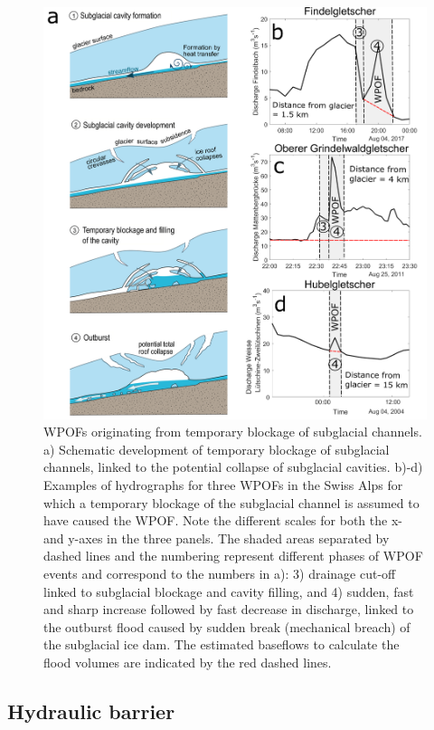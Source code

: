 \begin{figure}
    \centering
    \includegraphics[width=1\textwidth]{chapters/chapter_WPOFs/Temp_blockage.pdf}
    \caption{ WPOFs originating from temporary blockage of subglacial channels. a) Schematic development of temporary blockage of subglacial channels, linked to the potential collapse of subglacial cavities. b)-d) Examples of hydrographs for three WPOFs in the Swiss Alps for which a temporary blockage of the subglacial channel is assumed to have caused the WPOF. Note the different scales for both the x- and y-axes in the three panels. The shaded areas separated by dashed lines and the numbering represent different phases of WPOF events and correspond to the numbers in a): 3) drainage cut-off linked to subglacial blockage and cavity filling, and 4) sudden, fast and sharp increase followed by fast decrease in discharge, linked to the outburst flood caused by sudden break (mechanical breach) of the subglacial ice dam. The estimated baseflows to calculate the flood volumes are indicated by the red dashed lines.}
    \label{fig:IceBlockage}
\end{figure}


\subsection{ Hydraulic barrier}
\label{sec:hydraulic_barrier}

